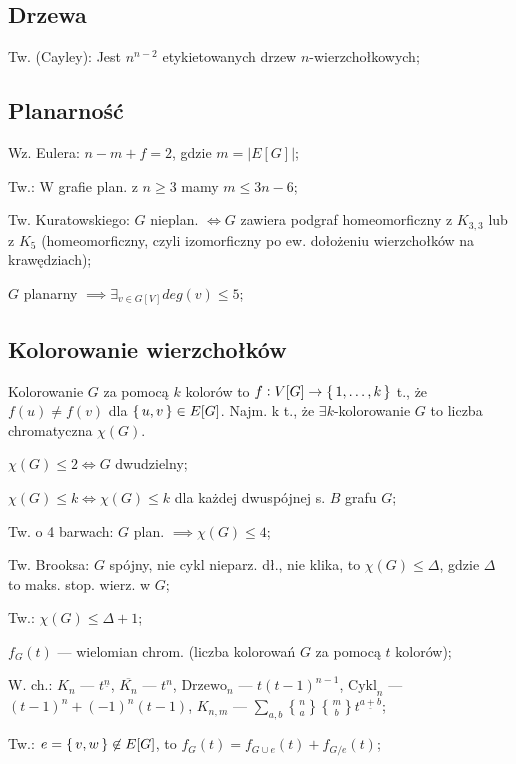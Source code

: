 \subsection{Drzewa}

Tw. (Cayley): Jest $n^{n-2}$ etykietowanych drzew $n$-wierzchołkowych;

\subsection{Planarność}

Wz. Eulera: $n - m + f = 2$, gdzie $m = |E[G]|$;

Tw.: W grafie plan. z $n \geq 3$ mamy $m \leq 3n -6$;

Tw. Kuratowskiego: $G$ nieplan. $\iff G$ zawiera podgraf homeomorficzny
  z $K_{3,3}$ lub z $K_5$ (homeomorficzny, czyli
  izomorficzny po ew. dołożeniu wierzchołków na krawędziach);

$G$ planarny $\implies \exists_{v \in G[V]} deg(v) \leq 5$;

\subsection{Kolorowanie wierzchołków}

Kolorowanie $G$ za pomocą $k$ kolorów to
  $f: V[G] \rightarrow \set{1, \dots, k}$ t., że $f(u) \neq f(v)$ dla
  $\set{u, v} \in E[G]$. Najm. k t., że $\exists k$-kolorowanie $G$ to liczba
  chromatyczna $\chi (G)$.

$\chi(G) \leq 2 \Leftrightarrow G$ dwudzielny;

$\chi(G) \leq k \Leftrightarrow \chi(G) \leq k$ dla każdej dwuspójnej s. $B$
  grafu $G$;

Tw. o 4 barwach: $G$ plan. $\implies\chi(G)\leq 4$;

Tw. Brooksa: $G$ spójny, nie cykl nieparz. dł., nie klika, to
  $\chi(G) \leq \Delta$, gdzie $\Delta$ to maks. stop. wierz. w $G$;

Tw.: $\chi(G) \leq \Delta + 1$;

$f_G(t)$ --- wielomian chrom. (liczba kolorowań $G$ za pomocą $t$ kolorów);

W. ch.:
$K_n$ --- $t^{\underline{n}}$,
$\overline{K_n}$ --- $t^n$,
$\text{Drzewo}_n$ --- $t(t-1)^{n-1}$,
$\text{Cykl}_n$ --- $(t-1)^n + (-1)^n(t-1)$,
$K_{n,m}$ --- $\sum_{a,b}{n \brace a}{m \brace b}t^{\underline{a+b}}$;

Tw.: $e = \set{v, w} \not\in E[G]$, to $f_G(t)=f_{G\cup e}(t) + f_{G/e}(t)$;

